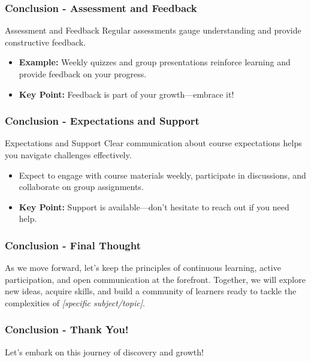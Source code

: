 \documentclass[aspectratio=169]{beamer}
\begin{document}
\begin{frame}[fragile]
  \frametitle{Conclusion - Assessment and Feedback}
  \begin{block}{Assessment and Feedback}
    Regular assessments gauge understanding and provide constructive feedback.
  \end{block}
  \begin{itemize}
    \item \textbf{Example:} Weekly quizzes and group presentations reinforce learning and provide feedback on your progress.
    \item \textbf{Key Point:} Feedback is part of your growth—embrace it!
  \end{itemize}
\end{frame}

\begin{frame}[fragile]
  \frametitle{Conclusion - Expectations and Support}
  \begin{block}{Expectations and Support}
    Clear communication about course expectations helps you navigate challenges effectively.
  \end{block}
  \begin{itemize}
    \item Expect to engage with course materials weekly, participate in discussions, and collaborate on group assignments.
    \item \textbf{Key Point:} Support is available—don’t hesitate to reach out if you need help.
  \end{itemize}
\end{frame}

\begin{frame}[fragile]
  \frametitle{Conclusion - Final Thought}
  As we move forward, let's keep the principles of continuous learning, active participation, and open communication at the forefront. Together, we will explore new ideas, acquire skills, and build a community of learners ready to tackle the complexities of \textit{[specific subject/topic]}.
\end{frame}

\begin{frame}[fragile]
  \frametitle{Conclusion - Thank You!}
  Let’s embark on this journey of discovery and growth!
\end{frame}
\end{document}
